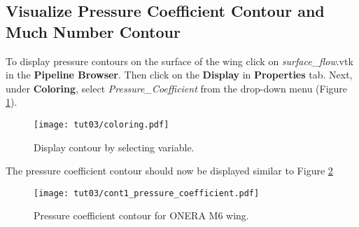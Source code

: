 \subsection{Visualize Pressure Coefficient Contour and Much Number Contour}
To display pressure contours on the surface of the wing click on \textit{surface\_flow}.vtk in the \textbf{Pipeline Browser}. Then click on the \textbf{Display} in \textbf{Properties} tab. Next, under \textbf{Coloring}, select \textit{Pressure\_Coefficient} from the drop-down menu (Figure \ref{fig3:pressure_coeff_1}).
\begin{figure}[htbp]
    \centering
    \texttt{[image: tut03/coloring.pdf]}
    \caption{Display contour by selecting variable.}
    \label{fig3:pressure_coeff_1}
\end{figure}
The pressure coefficient contour should now be displayed similar to Figure \ref{fig3:plot_pressure_coeff}
\begin{figure}[htbp]
    \centering
    \texttt{[image: tut03/cont1\_pressure\_coefficient.pdf]}
    \caption{Pressure coefficient contour for ONERA M6 wing.}
    \label{fig3:plot_pressure_coeff}
\end{figure}


